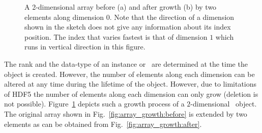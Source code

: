 \begin{figure}[tb]
\centering
\begin{minipage}[c]{0.25\linewidth}
\end{minipage}
\hspace{0.01\linewidth}
\begin{minipage}[c]{0.3\linewidth}
\end{minipage}
\hfill
\begin{minipage}[c]{0.4\linewidth}
\caption{{\small\label{fig:array_growth}A 2-dimensional array before (a) and
after growth (b) by two elements along dimension 0. Note that the direction of a
dimension shown in the sketch does not give any information about its index
position. The index that varies fastest is that of dimension $1$ which runs in
vertical direction in this figure.}}
\end{minipage}
\end{figure}
The rank and the data-type of an instance or \nxfield\ are determined at the
time the object is created. However, the number of elements along each dimension
can be altered at any time during the lifetime of the object.
However, due to limitations of HDF5 the number of elements along each dimension
can only grow (deletion is not possible). 
Figure~\ref{fig:array_growth} depicts such a growth process of a $2$-dimensional 
\nxfield\ object. The original array shown in
Fig.~\ref{fig:array_growth:before} is extended by two elements as can be
obtained from Fig.~\ref{fig:array_growth:after}.


